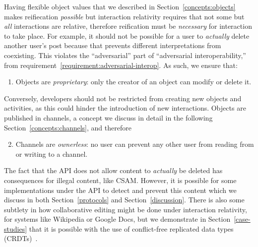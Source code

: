 
Having flexible object values that we described in Section~\ref{concepts:objects} makes reifiecation \emph{possible}
but interaction relativity requires that not some but \emph{all} interactions
are relative, therefore reification must be \emph{necessary}
for interaction to take place.
For example, it should not be possible for a user to \emph{actually}
delete another user's post because that prevents different interpretations
from coexisting.
This violates the ``adversarial'' part of ``adversarial interoperability,''
from requirement~\ref{requirement:adversarial-interop}.
As such, we ensure that:
\begin{enumerate}
\item
Objects are \emph{proprietary}: only the creator of an object can modify or delete it.
\end{enumerate}
Conversely, developers should not be restricted from creating new objects and activities,
as this could hinder the introduction of new interactions.
Objects are published in channels, a concept we discuss in detail
in the following Section~\ref{concepts:channels}, and therefore
\begin{enumerate}
\setcounter{enumi}{1}
\item
Channels are \emph{ownerless}: no user can prevent any other user from reading from or writing to a channel.
\end{enumerate}

The fact that the API does not allow content to \emph{actually} be deleted
has consequences for illegal content, like CSAM.
However, it is possible for some implementations under the API to detect
and prevent this content which we discuss in both
Section~\ref{protocols} and Section~\ref{discussion}.
There is also some subtlety in how collaborative editing might be done under interaction relativity,
for systems like Wikipedia or Google Docs,
but we demonstrate in Section~\ref{case-studies} that
it is possible with the use of conflict-free replicated data types (CRDTs)~\cite{crdts}.



